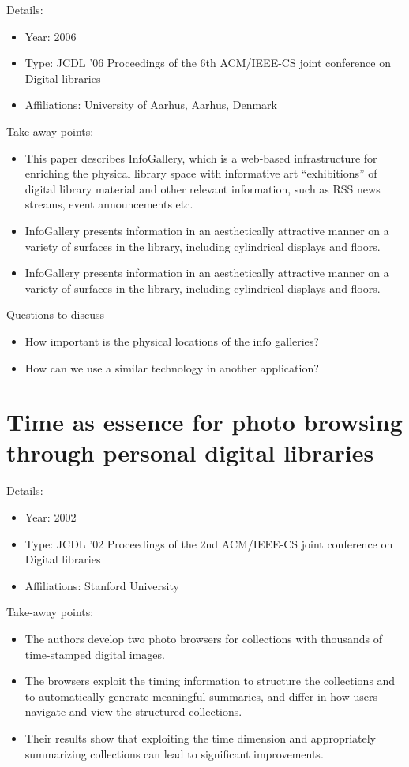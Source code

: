 \documentclass[12pt, onecolumn]{IEEEtran}
\begin{document}
\noindent Details:
\begin{itemize}
  \item Year: 2006
  \item Type: JCDL '06 Proceedings of the 6th ACM/IEEE-CS joint conference on
  Digital libraries
  \item Affiliations: University of Aarhus, Aarhus, Denmark
\end{itemize}
\medskip
Take-away points: 
\begin{itemize}
  \item This paper describes InfoGallery, which is a web-based 
infrastructure for enriching the physical library space with 
informative art “exhibitions” of digital library material and other 
relevant information, such as RSS news streams, event 
announcements etc.
\item InfoGallery  presents information in an 
aesthetically attractive manner on a variety of surfaces in the 
library, including cylindrical displays and floors.
\item InfoGallery  presents information in an 
aesthetically attractive manner on a variety of surfaces in the 
library, including cylindrical displays and floors.
\end{itemize}
	
\noindent Questions to discuss
\begin{itemize}
  \item How important is the physical locations of the info galleries?
  \item How can we use a similar technology in another application?
\end{itemize}
\bigskip\bigskip

\section{Time as essence for photo browsing through personal digital libraries
\cite{Graham:2002:TEP:544220.544301}}

\noindent Details:
\begin{itemize}
  \item Year: 2002
  \item Type: JCDL '02 Proceedings of the 2nd ACM/IEEE-CS joint conference on Digital libraries
  \item Affiliations: Stanford University
\end{itemize}
\medskip
Take-away points: 
\begin{itemize}
  \item The authors develop two photo browsers for collections with thousands of
  time-stamped digital images. 
  \item The browsers exploit the timing information to structure the collections
  and to automatically generate meaningful summaries, and differ in how
  users navigate and view the structured collections.
  \item Their results show that exploiting the time dimension and appropriately
  summarizing collections can lead to significant improvements.
\end{itemize}
	
\end{document}

